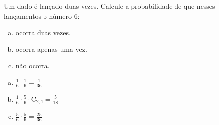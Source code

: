 \begin{ex}
Um dado é lançado duas vezes. Calcule a probabilidade de que nesses lançamentos o número 6:
   \begin{enumerate}[(a)]
   \item ocorra duas vezes.
   \item ocorra apenas uma vez.
   \item não ocorra.
   \end{enumerate}
     \begin{sol}
      \phantom{A}
       \begin{enumerate}[(a)]
           \item $\frac{1}{6}\cdot\frac{1}{6}=\frac{1}{36}$
           \item $\frac{1}{6}\cdot\frac{5}{6}\cdot\mathrm{C}_{2,1}=\frac{5}{18}$
           \item $\frac{5}{6}\cdot\frac{5}{6}=\frac{25}{36}$
       \end{enumerate}
     \end{sol}
\end{ex}